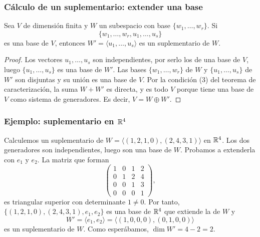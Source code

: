 \begin{frame}[allowframebreaks, t]
    \frametitle{Cálculo de un suplementario: extender una base}

    \begin{proposition}
        Sea $V$ de dimensión finita y $W$ un subespacio con base
        $\{w_1,\ldots,w_r\}$. Si
        \[
            \{w_1,\ldots,w_r,u_1,\ldots,u_s\}
        \]
        es una base de $V$, entonces $W'=\langle u_1,\ldots,u_s\rangle$ es un
        suplementario de $W$. 
    \end{proposition}

    \begin{proof}
        Los vectores $u_1,\ldots,u_s$ son independientes, por serlo
        los de una base de $V$, luego $\{u_1,\ldots,u_s\}$ es una base
        de $W'$. Las bases $\{w_1,\ldots,w_r\}$ de $W$ y
        $\{u_1,\ldots,u_s\}$ de $W'$ son disjuntas y su unión es una base de
        $V$. Por la condición (3) del teorema de caracterización, la suma
        $W+W'$ es directa, y es todo $V$ porque tiene una base de $V$
        como sistema de generadores. Es decir, $V=W\oplus W'$.
    \end{proof}

\end{frame}


\begin{frame}
    \frametitle{Ejemplo: suplementario en $\mathbb{R}^4$}

    \begin{example}
        Calculemos un suplementario de
        $W=\langle(1,2,1,0),(2,4,3,1)\rangle$ en $\mathbb{R}^4$.
        Los dos generadores son independientes, luego son una base de $W$.
        Probamos a extenderla con $e_1$ y $e_2$. La matriz que forman
        \[
            \begin{pmatrix}
                1&0&1&2\\0&1&2&4\\0&0&1&3\\0&0&0&1
            \end{pmatrix},
        \]
        es triangular superior con determinante $1\neq 0$. Por tanto, $\{(1,2,1,0),(2,4,3,1),e_1,e_2\}$ es una base
        de $\mathbb{R}^4$ que extiende la de $W$ y
        \[
            W'=\langle e_1,e_2\rangle=\langle(1,0,0,0),(0,1,0,0)\rangle
        \]
        es un suplementario de $W$. Como esperábamos, $\dim W'=4-2=2$.
    \end{example}
\end{frame}



